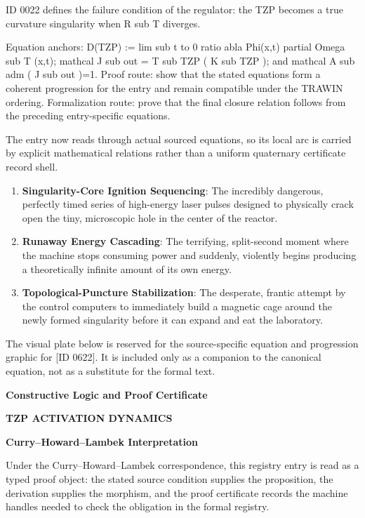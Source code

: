 ID 0022 defines the failure condition of the regulator: the TZP becomes a true curvature singularity when R sub T diverges.

Equation anchors: D(TZP) := lim sub t to 0 ratio abla Phi(x,t) partial Omega sub T (x,t); mathcal J sub out = T sub TZP ( K sub TZP ); and mathcal A sub adm ( J sub out )=1. Proof route: show that the stated equations form a coherent progression for the entry and remain compatible under the TRAWIN ordering. Formalization route: prove that the final closure relation follows from the preceding entry-specific equations.

The entry now reads through actual sourced equations, so its local arc is carried by explicit mathematical relations rather than a uniform quaternary certificate record shell.
\endgroup

\begin{enumerate}[leftmargin=1.6em,itemsep=6pt,topsep=4pt]
\item \textbf{Singularity-Core Ignition Sequencing}: The incredibly dangerous, perfectly timed series of high-energy laser pulses designed to physically crack open the tiny, microscopic hole in the center of the reactor.
\item \textbf{Runaway Energy Cascading}: The terrifying, split-second moment where the machine stops consuming power and suddenly, violently begins producing a theoretically infinite amount of its own energy.
\item \textbf{Topological-Puncture Stabilization}: The desperate, frantic attempt by the control computers to immediately build a magnetic cage around the newly formed singularity before it can expand and eat the laboratory.
\end{enumerate}

\begingroup\footnotesize\sloppy
The visual plate below is reserved for the source-specific equation and progression graphic for [ID 0622]. It is included only as a companion to the canonical equation, not as a substitute for the formal text.
\par\endgroup
\ifTZPDarkEdition
{}
\fi

\clearpage
\begingroup\tzpsupportsetup
\noindent\textbf{\fontsize{10.8pt}{12.8pt}\selectfont [ID 0622] Constructive Logic and Proof Certificate}\par
\noindent\textbf{\fontsize{10pt}{12pt}\selectfont TZP ACTIVATION DYNAMICS}\par
\vspace{0.45em}
\begingroup
\footnotesize
\setlength{\parskip}{0.22em}
\setlength{\parindent}{0pt}
\noindent\textbf{Curry--Howard--Lambek Interpretation}\par
Under the Curry--Howard--Lambek correspondence, this registry entry is read as a typed proof
object: the stated source condition supplies the proposition, the derivation supplies the
morphism, and the proof certificate records the machine handles needed to check the obligation
in the formal registry.

